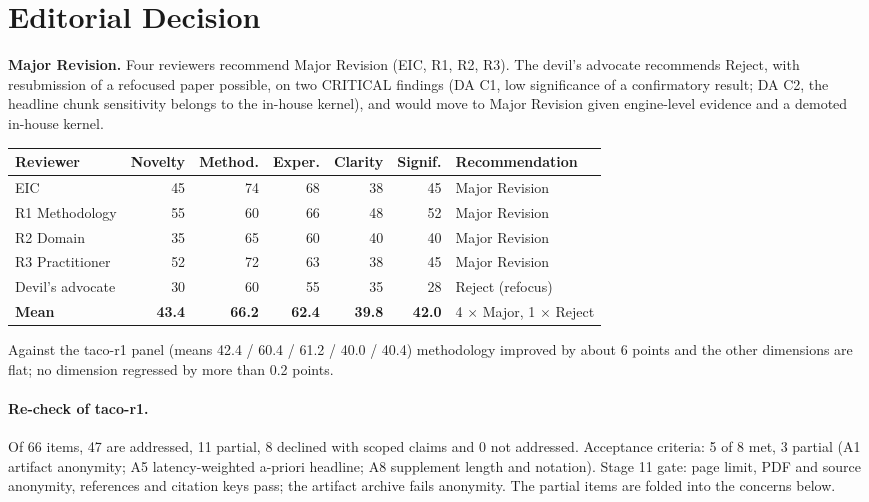 \documentclass[11pt]{article}
\begin{document}
\section*{Editorial Decision}

\textbf{Major Revision.} Four reviewers recommend Major Revision (EIC, R1, R2,
R3). The devil's advocate recommends Reject, with resubmission of a refocused
paper possible, on two CRITICAL findings (DA C1, low significance of a
confirmatory result; DA C2, the headline chunk sensitivity belongs to the
in-house kernel), and would move to Major Revision given engine-level evidence
and a demoted in-house kernel.

\begin{center}
\small
\begin{tabular}{lrrrrrl}
\toprule
Reviewer & Novelty & Method. & Exper. & Clarity & Signif.
  & Recommendation \\
\midrule
EIC & 45 & 74 & 68 & 38 & 45 & Major Revision \\
R1 Methodology & 55 & 60 & 66 & 48 & 52 & Major Revision \\
R2 Domain & 35 & 65 & 60 & 40 & 40 & Major Revision \\
R3 Practitioner & 52 & 72 & 63 & 38 & 45 & Major Revision \\
Devil's advocate & 30 & 60 & 55 & 35 & 28 & Reject (refocus) \\
\midrule
\textbf{Mean} & \textbf{43.4} & \textbf{66.2} & \textbf{62.4} & \textbf{39.8}
  & \textbf{42.0} & 4 $\times$ Major, 1 $\times$ Reject \\
\bottomrule
\end{tabular}
\end{center}

Against the taco-r1 panel (means 42.4 / 60.4 / 61.2 / 40.0 / 40.4) methodology
improved by about 6 points and the other dimensions are flat; no dimension
regressed by more than 0.2 points.

\paragraph{Re-check of taco-r1.} Of 66 items, 47 are addressed, 11 partial, 8
declined with scoped claims and 0 not addressed. Acceptance criteria: 5 of 8
met, 3 partial (A1 artifact anonymity; A5 latency-weighted a-priori headline;
A8 supplement length and notation). Stage 11 gate: page limit, PDF and source
anonymity, references and citation keys pass; the artifact archive fails
anonymity. The partial items are folded into the concerns below.
\end{document}
